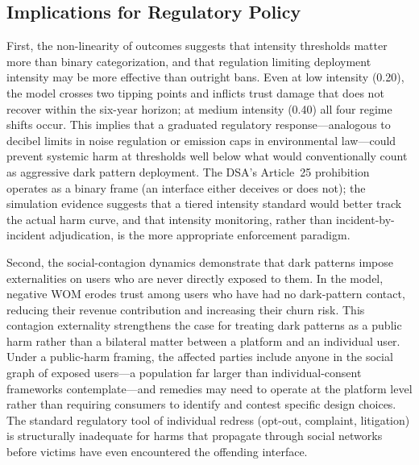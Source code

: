 \documentclass[a4paper]{article}
\begin{document}
\subsection{Implications for Regulatory Policy}
First, the non-linearity of outcomes suggests that intensity thresholds matter more than binary categorization, and that regulation limiting deployment intensity may be more effective than outright bans. Even at low intensity (0.20), the model crosses two tipping points and inflicts trust damage that does not recover within the six-year horizon; at medium intensity (0.40) all four regime shifts occur. This implies that a graduated regulatory response---analogous to decibel limits in noise regulation or emission caps in environmental law---could prevent systemic harm at thresholds well below what would conventionally count as aggressive dark pattern deployment. The DSA's Article~25 prohibition operates as a binary frame (an interface either deceives or does not); the simulation evidence suggests that a tiered intensity standard would better track the actual harm curve, and that intensity monitoring, rather than incident-by-incident adjudication, is the more appropriate enforcement paradigm.

Second, the social-contagion dynamics demonstrate that dark patterns impose externalities on users who are never directly exposed to them. In the model, negative WOM erodes trust among users who have had no dark-pattern contact, reducing their revenue contribution and increasing their churn risk. This contagion externality strengthens the case for treating dark patterns as a public harm \citep{oecd2022} rather than a bilateral matter between a platform and an individual user. Under a public-harm framing, the affected parties include anyone in the social graph of exposed users---a population far larger than individual-consent frameworks contemplate---and remedies may need to operate at the platform level rather than requiring consumers to identify and contest specific design choices. The standard regulatory tool of individual redress (opt-out, complaint, litigation) is structurally inadequate for harms that propagate through social networks before victims have even encountered the offending interface.
\end{document}
